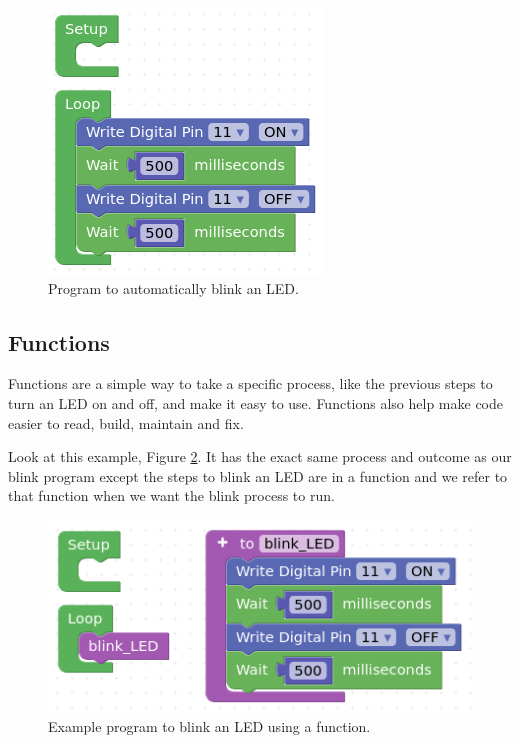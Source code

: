 \documentclass[12pt]{article}
\begin{document}
	\begin{figure}[H]
		\begin{center}
			\includegraphics[scale=0.7]{p_blink}
			\caption{Program to automatically blink an LED.}
			\label{prog:blink}
		\end{center}
	\end{figure}
	
		
	\subsection{Functions}
	
	Functions are a simple way to take a specific process, like the previous steps to turn an LED on and off, and make it easy to use. Functions also help make code easier to read, build, maintain and fix.
	
	Look at this example, Figure \ref{prog:blink_function}. It has the exact same process and outcome as our blink program except the steps to blink an LED are in a function and we refer to that function when we want the blink process to run.
	
	\begin{figure}[H]
		\begin{center}
			\includegraphics[scale=0.7]{p_blink_function}
			\caption{Example program to blink an LED using a function.}
			\label{prog:blink_function}
		\end{center}
	\end{figure}
\end{document}
